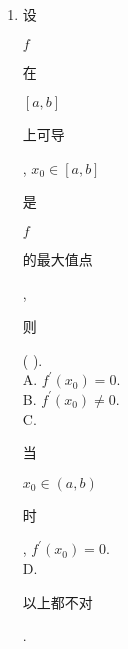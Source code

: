 \documentclass[10pt]{article}
\begin{document}
\begin{enumerate}
  \item \begin{CJK}{UTF8}{mj}设\end{CJK} $f$ \begin{CJK}{UTF8}{mj}在\end{CJK} $[a, b]$ \begin{CJK}{UTF8}{mj}上可导\end{CJK}, $x_{0} \in[a, b]$ \begin{CJK}{UTF8}{mj}是\end{CJK} $f$ \begin{CJK}{UTF8}{mj}的最大值点\end{CJK}, \begin{CJK}{UTF8}{mj}则\end{CJK} ( ).\\
A. $f^{\prime}\left(x_{0}\right)=0$.\\
B. $f^{\prime}\left(x_{0}\right) \neq 0 .$\\
C. \begin{CJK}{UTF8}{mj}当\end{CJK} $x_{0} \in(a, b)$ \begin{CJK}{UTF8}{mj}时\end{CJK}, $f^{\prime}\left(x_{0}\right)=0$.\\
D. \begin{CJK}{UTF8}{mj}以上都不对\end{CJK}.


\end{enumerate}
\end{document}
